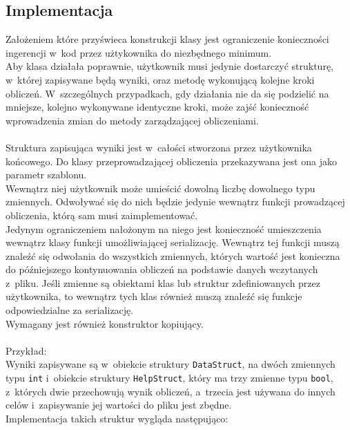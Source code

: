 \documentclass[a4paper]{article}
\begin{document}
\subsection{Implementacja}
Założeniem które przyświeca konstrukcji klasy jest ograniczenie konieczności ingerencji w~kod przez użtykownika do niezbędnego minimum.\\
Aby klasa działała poprawnie, użytkownik musi jedynie dostarczyć strukturę, w~której zapisywane będą wyniki, oraz metodę wykonującą kolejne kroki obliczeń.
W~szczególnych przypadkach, gdy działania nie da się podzielić na mniejsze, kolejno wykonywane identyczne kroki, może zajść konieczność wprowadzenia zmian do metody zarządzającej obliczeniami.\\
~\\
Struktura zapisująca wyniki jest w~całości stworzona przez użytkownika końcowego. 
Do klasy przeprowadzającej obliczenia przekazywana jest ona jako parametr szablonu. \\
Wewnątrz niej użytkownik może umieścić dowolną liczbę dowolnego typu zmiennych. 
Odwoływać się do nich będzie jedynie wewnątrz funkcji prowadzącej obliczenia, którą sam musi zaimplementować.\\
Jedynym ograniczeniem nałożonym na niego jest konieczność umieszczenia wewnątrz klasy funkcji umożliwiającej serializację.
Wewnątrz tej funkcji muszą znaleźć się odwołania do wszystkich zmiennych, których wartość jest konieczna do późniejszego kontynuowania obliczeń na podstawie danych wczytanych z~pliku.
Jeśli zmienne są obiektami klas lub struktur zdefiniowanych przez użytkownika, to wewnątrz tych klas również muszą znaleźć się funkcje odpowiedzialne za serializację.\\
Wymagany jest również konstruktor kopiujący.\\
~\\
Przykład:\\
Wyniki zapisywane są w~obiekcie struktury \texttt{DataStruct}, na dwóch zmiennych typu \texttt{int} i~obiekcie struktury \texttt{HelpStruct}, który ma trzy zmienne typu \texttt{bool}, z~których dwie przechowują wynik obliczeń, a~trzecia jest używana do innych celów i~zapisywanie jej wartości do pliku jest zbędne.\\
Implementacja takich struktur wygląda następująco:
\end{document}
